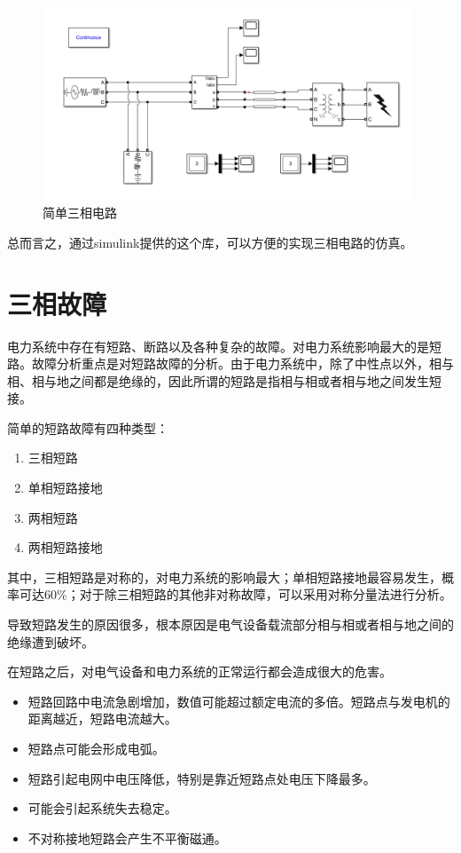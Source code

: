 \documentclass{article}
\begin{document}
{	\begin{figure}[h]
		\centering
		\includegraphics[width=11cm]{figure/three_phase.png}
		\caption{简单三相电路}
	\end{figure}
	总而言之，通过simulink提供的这个库，可以方便的实现三相电路的仿真。
	
	\section{三相故障}
	
	电力系统中存在有短路、断路以及各种复杂的故障。对电力系统影响最大的是短路。故障分析重点是对短路故障的分析。由于电力系统中，除了中性点以外，相与相、相与地之间都是绝缘的，因此所谓的短路是指相与相或者相与地之间发生短接。
	
	简单的短路故障有四种类型：
	
	\begin{enumerate}
		\item 三相短路
		\item 单相短路接地
		\item 两相短路
		\item 两相短路接地
	\end{enumerate}

	其中，三相短路是对称的，对电力系统的影响最大；单相短路接地最容易发生，概率可达60\%；对于除三相短路的其他非对称故障，可以采用对称分量法进行分析。
	
	导致短路发生的原因很多，根本原因是电气设备载流部分相与相或者相与地之间的绝缘遭到破坏。
	
	在短路之后，对电气设备和电力系统的正常运行都会造成很大的危害。
	
	\begin{itemize}
		\item 短路回路中电流急剧增加，数值可能超过额定电流的多倍。短路点与发电机的距离越近，短路电流越大。
		\item 短路点可能会形成电弧。
		\item 短路引起电网中电压降低，特别是靠近短路点处电压下降最多。
		\item 可能会引起系统失去稳定。
		\item 不对称接地短路会产生不平衡磁通。
	\end{itemize}

}
\end{document}
